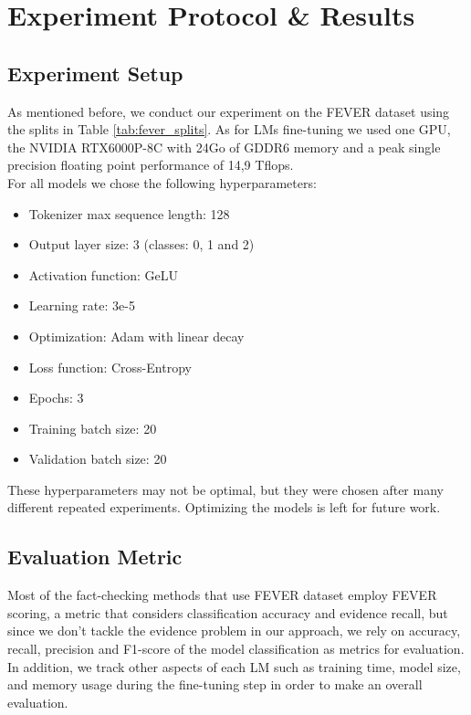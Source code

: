 \documentclass[conference]{IEEEtran}
\begin{document}
\section{Experiment Protocol \& Results}
\subsection{Experiment Setup}
As mentioned before, we conduct our experiment on the FEVER dataset using the splits in Table \ref{tab:fever_splits}. As for LMs fine-tuning we used one GPU, the NVIDIA RTX6000P-8C with 24Go of GDDR6 memory and a peak single precision floating point performance of 14,9 Tflops.\\

For all models we chose the following hyperparameters:

\begin{itemize}
\item Tokenizer max sequence length: 128
\item Output layer size: 3 (classes: 0, 1 and 2)
\item Activation function: GeLU
\item Learning rate: 3e-5
\item Optimization: Adam with linear decay
\item Loss function: Cross-Entropy
\item Epochs: 3
\item Training batch size: 20
\item Validation batch size: 20\\
\end{itemize}

These hyperparameters may not be optimal, but they were chosen after many different repeated experiments. Optimizing the models is left for future work.
\subsection{Evaluation Metric}
Most of the fact-checking methods that use FEVER dataset employ FEVER scoring\cite{thorne2018fever}, a metric that considers classification accuracy and evidence recall, but since we don't tackle the evidence problem in our approach, we rely on accuracy, recall, precision and F1-score of the model classification as metrics for evaluation.\\
In addition, we track other aspects of each LM such as training time, model size, and memory usage during the fine-tuning step in order to make an overall evaluation.
\end{document}
